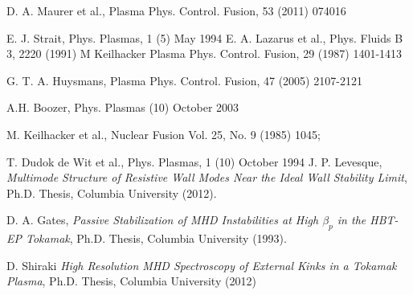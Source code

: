 \documentclass[aps,prl,twocolumn,superscriptaddress,groupedaddress]{revtex4}  %
\begin{document}

\begin{thebibliography}{99}
 D. A. Maurer et al., Plasma Phys. Control. Fusion, 53 (2011) 074016

 E. J. Strait, Phys. Plasmas, 1 (5) May 1994
 E. A. Lazarus et al., Phys. Fluids B 3, 2220 (1991)
 M Keilhacker Plasma Phys. Control. Fusion, 29 (1987) 1401-1413

 G. T. A. Huysmans, Plasma Phys. Control. Fusion, 47 (2005) 2107-2121 

 A.H. Boozer, Phys. Plasmas (10) October 2003

 M. Keilhacker et al., Nuclear Fusion Vol. 25, No. 9 (1985) 1045;

 T. Dudok de Wit et al., Phys. Plasmas, 1 (10) October 1994
 J. P. Levesque, \emph{Multimode Structure of Resistive Wall Modes Near the Ideal Wall Stability Limit}, Ph.D. Thesis, Columbia University (2012).

 D. A. Gates, \emph{Passive Stabilization of MHD Instabilities at High ${\beta_p}$ in the HBT-EP Tokamak}, Ph.D. Thesis, Columbia University (1993).

 D. Shiraki \emph{High Resolution MHD Spectroscopy of External Kinks in a Tokamak Plasma}, Ph.D. Thesis, Columbia University (2012)





\end{thebibliography}
\end{document}
